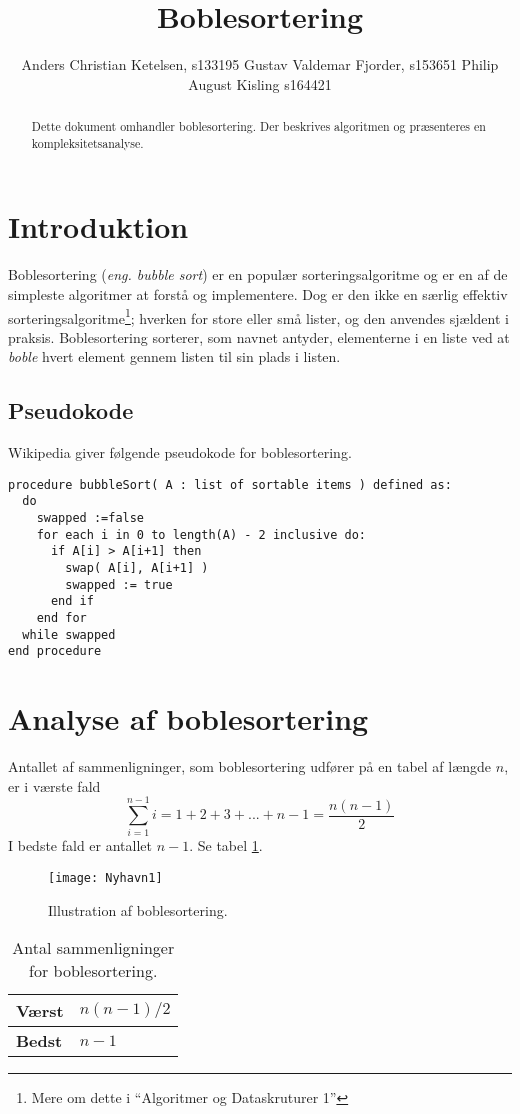 \documentclass[10pt,a4paper]{article}
\author{Anders Christian Ketelsen, s133195 Gustav Valdemar Fjorder, s153651 Philip August Kisling s164421}
\title{Boblesortering}
\begin{document}
\maketitle
\begin{abstract}
Dette dokument omhandler boblesortering. Der beskrives algoritmen og præsenteres en kompleksitetsanalyse.
\end{abstract}
\section{Introduktion}

Boblesortering (\textsl{eng. bubble sort}) er en populær sorteringsalgoritme og er en af de simpleste algoritmer at forstå og implementere. Dog er den ikke en særlig effektiv sorteringsalgoritme\footnote{Mere om dette i ``Algoritmer og Dataskruturer 1''}; hverken for store eller små lister, og den anvendes sjældent i praksis. Boblesortering sorterer, som navnet antyder, elementerne i en liste ved at \textsl{boble} hvert element gennem listen til sin plads i listen.


\subsection{Pseudokode}
Wikipedia \cite{wiki} giver følgende pseudokode for boblesortering.
\begin{verbatim}
procedure bubbleSort( A : list of sortable items ) defined as:
  do
    swapped :=false
    for each i in 0 to length(A) - 2 inclusive do:
      if A[i] > A[i+1] then
        swap( A[i], A[i+1] )
        swapped := true
      end if
    end for
  while swapped
end procedure
\end{verbatim}


\section{Analyse af boblesortering}
Antallet af sammenligninger, som boblesortering udfører på en tabel af længde $n$, er i værste fald
\[\sum_{i=1}^{n-1}i=1+2+3+...+n-1=\frac{n(n-1)}{2}\]
I bedste fald er antallet $n-1$. Se tabel \ref{table:Boblesortering}.
\newpage

\begin{figure}
\centering
\texttt{[image: Nyhavn1]}\caption{Illustration af boblesortering.}\label{fig:nyhavn}
\end{figure}

\begin{table}[]
\centering
\label{table:Boblesortering}
\begin{tabular}{|l|l|}
\hline
\textbf{Værst} & $n(n-1)/2$  \\ \hline
\textbf{Bedst} & $n-1$ \\ \hline
\end{tabular}
\caption{Antal sammenligninger for boblesortering.}
\end{table}
\end{document}
